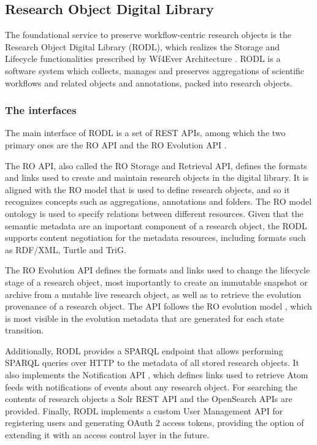 \subsection{Research Object Digital Library}
\label{sec:rodl}


The foundational service to preserve workflow-centric research objects is the Research Object Digital Library (RODL), which realizes the Storage and Lifecycle functionalities prescribed by Wf4Ever Architecture \cite{w4fever_d132}. RODL is a software system which collects, manages and preserves aggregations of scientific workflows and related objects and annotations, packed into research objects.


\subsubsection{The interfaces}

The main interface of RODL is a set of REST APIs, among which the two primary ones are the RO API \cite{RO-API} and the RO Evolution API \cite{RO-EVO-API}.

The RO API, also called the RO Storage and Retrieval API, defines the formats and links used to create and maintain research objects in the digital library. It is aligned with the RO model that is used to define research objects, and so it recognizes concepts such as aggregations, annotations and folders. The RO model ontology \cite{RO_model} is used to specify relations between different resources. Given that the semantic metadata are an important component of a research object, the RODL supports content negotiation for the metadata resources, including formats such as RDF/XML, Turtle and TriG.

The RO Evolution API defines the formats and links used to change the lifecycle stage of a research object, most importantly to create an immutable snapshot or archive from a mutable live research object, as well as to retrieve the evolution provenance of a research object. The API follows the RO evolution model \cite{w4fever_d321}, which is most visible in the evolution metadata that are generated for each state transition.

Additionally, RODL provides a SPARQL endpoint that allows performing SPARQL queries over HTTP to the metadata of all stored research objects. It also implements the Notification API \cite{Notification-API}, which defines links used to retrieve Atom feeds with notifications of events about any research object. For searching the contents of research objects a Solr REST API and the OpenSearch APIs are provided. Finally, RODL implements a custom User Management API \cite{UM-API} for registering users and generating OAuth 2 access tokens, providing the option of extending it with an access control layer in the future.



